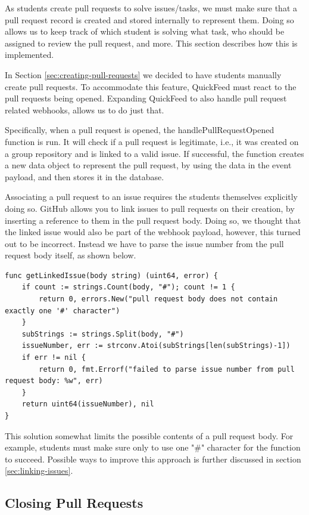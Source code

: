 As students create pull requests to solve issues/tasks, we must make sure that a pull request record is created and stored internally to represent them.
Doing so allows us to keep track of which student is solving what task, who should be assigned to review the pull request, and more.
This section describes how this is implemented.

In Section \ref{sec:creating-pull-requests} we decided to have students manually create pull requests.
To accommodate this feature, QuickFeed must react to the pull requests being opened.
Expanding QuickFeed to also handle pull request related webhooks, allows us to do just that.

Specifically, when a pull request is opened, the handlePullRequestOpened function is run.
It will check if a pull request is legitimate, i.e., it was created on a group repository and is linked to a valid issue.
If successful, the function creates a new data object to represent the pull request, by using the data in the event payload, and then stores it in the database.

Associating a pull request to an issue requires the students themselves explicitly doing so.
GitHub allows you to link issues to pull requests on their creation, by inserting a reference to them in the pull request body.
Doing so, we thought that the linked issue would also be part of the webhook payload, however, this turned out to be incorrect.
Instead we have to parse the issue number from the pull request body itself, as shown below.

\begin{lstlisting}[caption={The getLinkedIssue function}, language=Golang, label={code:getLinkedIssue}]
func getLinkedIssue(body string) (uint64, error) {
	if count := strings.Count(body, "#"); count != 1 {
		return 0, errors.New("pull request body does not contain exactly one '#' character")
	}
	subStrings := strings.Split(body, "#")
	issueNumber, err := strconv.Atoi(subStrings[len(subStrings)-1])
	if err != nil {
		return 0, fmt.Errorf("failed to parse issue number from pull request body: %w", err)
	}
	return uint64(issueNumber), nil
}
\end{lstlisting}

This solution somewhat limits the possible contents of a pull request body.
For example, students must make sure only to use one "\#" character for the function to succeed.
Possible ways to improve this approach is further discussed in section \ref{sec:linking-issues}.

\subsection{Closing Pull Requests}

